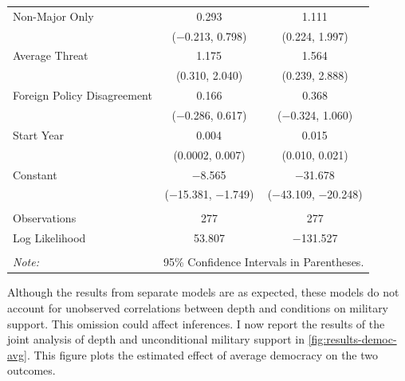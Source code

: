 \documentclass[12pt]{article}
\begin{document}
\begin{table}[!htbp]
\begin{tabular}{@{\extracolsep{5pt}}lcc}
  Non-Major Only & 0.293 & 1.111$^{}$ \\ 
  & ($-$0.213, 0.798) & (0.224, 1.997) \\ 
  Average Threat & 1.175$^{}$ & 1.564$^{}$ \\ 
  & (0.310, 2.040) & (0.239, 2.888) \\ 
  Foreign Policy Disagreement & 0.166 & 0.368 \\ 
  & ($-$0.286, 0.617) & ($-$0.324, 1.060) \\ 
  Start Year & 0.004$^{}$ & 0.015$^{}$ \\ 
  & (0.0002, 0.007) & (0.010, 0.021) \\ 
  Constant & $-$8.565$^{}$ & $-$31.678$^{}$ \\ 
  & ($-$15.381, $-$1.749) & ($-$43.109, $-$20.248) \\ 
 \hline \\[-1.8ex] 
Observations & 277 & 277 \\ 
Log Likelihood & 53.807 & $-$131.527 \\ 
\hline 
\hline \\[-1.8ex] 
\textit{Note:}  & \multicolumn{2}{r}{95\% Confidence Intervals in Parentheses.} \\ 
\end{tabular} 
\end{table} 

Although the results from separate models are as expected, these models do not account for unobserved correlations between depth and conditions on military support. 
This omission could affect inferences. 
I now report the results of the joint analysis of depth and unconditional military support in \autoref{fig:results-democ-avg}.
This figure plots the estimated effect of average democracy on the two outcomes. 
\end{document}
